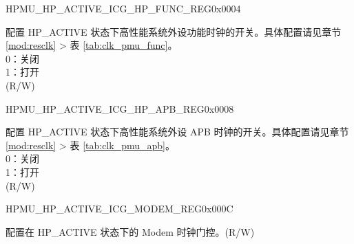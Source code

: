 \begin{register}{H}{PMU\_HP\_ACTIVE\_ICG\_HP\_FUNC\_REG}{0x0004}\label{regdesc:PMUHPACTIVEICGHPFUNCREG}
%
\regnewline%
\begin{regdesc}\begin{reglist}
\label{fielddesc:PMUHPACTIVEDIGICGFUNCEN}\item [PMU\_HP\_ACTIVE\_DIG\_ICG\_FUNC\_EN] 配置 HP\_ACTIVE 状态下高性能系统外设功能时钟的开关。具体配置请见章节 \ref{mod:resclk} \textit{} > 表 \ref{tab:clk_pmu_func}。\\
0：关闭\\
1：打开\\
(R/W)
\end{reglist}\end{regdesc}
\end{register}


\begin{register}{H}{PMU\_HP\_ACTIVE\_ICG\_HP\_APB\_REG}{0x0008}\label{regdesc:PMUHPACTIVEICGHPAPBREG}
%
\regnewline%
\begin{regdesc}\begin{reglist}
\label{fielddesc:PMUHPACTIVEDIGICGAPBEN}\item [PMU\_HP\_ACTIVE\_DIG\_ICG\_APB\_EN] 配置 HP\_ACTIVE 状态下高性能系统外设 APB 时钟的开关。具体配置请见章节 \ref{mod:resclk} \textit{} > 表 \ref{tab:clk_pmu_apb}。\\
0：关闭\\
1：打开\\
(R/W)
\end{reglist}\end{regdesc}
\end{register}


\begin{register}{H}{PMU\_HP\_ACTIVE\_ICG\_MODEM\_REG}{0x000C}\label{regdesc:PMUHPACTIVEICGMODEMREG}
%
%
\regnewline%
\begin{regdesc}\begin{reglist}
\label{fielddesc:PMUHPACTIVEDIGICGMODEMCODE}\item [PMU\_HP\_ACTIVE\_DIG\_ICG\_MODEM\_CODE] 配置在 HP\_ACTIVE 状态下的 Modem 时钟门控。(R/W)
\end{reglist}\end{regdesc}
\end{register}

